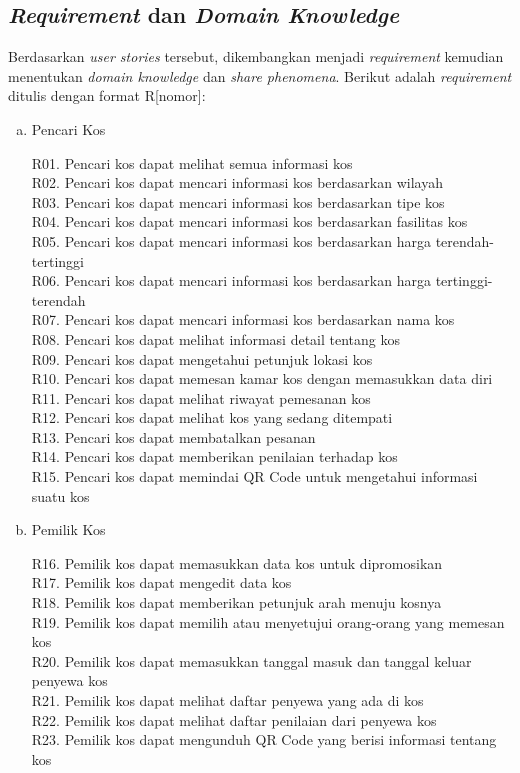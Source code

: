 	\subsection{\textit{Requirement} dan \textit{Domain Knowledge }}
	Berdasarkan \textit{user stories} tersebut, dikembangkan menjadi \textit{requirement} kemudian menentukan \textit{domain knowledge} dan \textit{share phenomena}. Berikut adalah \textit{requirement} ditulis dengan format R[nomor]:
	\begin{enumerate} [a.]
		\item Pencari Kos
		
		R01. Pencari kos dapat melihat semua informasi kos \\
		R02. Pencari kos dapat mencari informasi kos berdasarkan wilayah \\
		R03. Pencari kos dapat mencari informasi kos berdasarkan tipe kos \\
		R04. Pencari kos dapat mencari informasi kos berdasarkan fasilitas kos \\
		R05. Pencari kos dapat mencari informasi kos berdasarkan harga terendah-tertinggi \\
		R06. Pencari kos dapat mencari informasi kos berdasarkan harga tertinggi-terendah \\
		R07. Pencari kos dapat mencari informasi kos berdasarkan nama kos \\
		R08. Pencari kos dapat melihat informasi detail tentang kos \\
		R09. Pencari kos dapat mengetahui petunjuk lokasi kos \\
		R10. Pencari kos dapat memesan kamar kos dengan memasukkan data diri \\
		R11. Pencari kos dapat melihat riwayat pemesanan kos \\
		R12. Pencari kos dapat melihat kos yang sedang ditempati \\
		R13. Pencari kos dapat membatalkan pesanan \\
		R14. Pencari kos dapat memberikan penilaian terhadap kos \\
		R15. Pencari kos dapat memindai QR Code untuk mengetahui informasi suatu kos \\
		
		\item Pemilik Kos
		
		R16. Pemilik kos dapat memasukkan data kos untuk dipromosikan \\
		R17. Pemilik kos dapat mengedit data kos \\
		R18. Pemilik kos dapat memberikan petunjuk arah menuju kosnya \\
		R19. Pemilik kos dapat memilih atau menyetujui orang-orang yang memesan kos \\
		R20. Pemilik kos dapat memasukkan tanggal masuk dan tanggal keluar penyewa kos \\
		R21. Pemilik kos dapat melihat daftar penyewa yang ada di kos \\
		R22. Pemilik kos dapat melihat daftar penilaian dari penyewa kos \\
		R23. Pemilik kos dapat mengunduh QR Code yang berisi informasi tentang kos \\
		

\end{enumerate}
